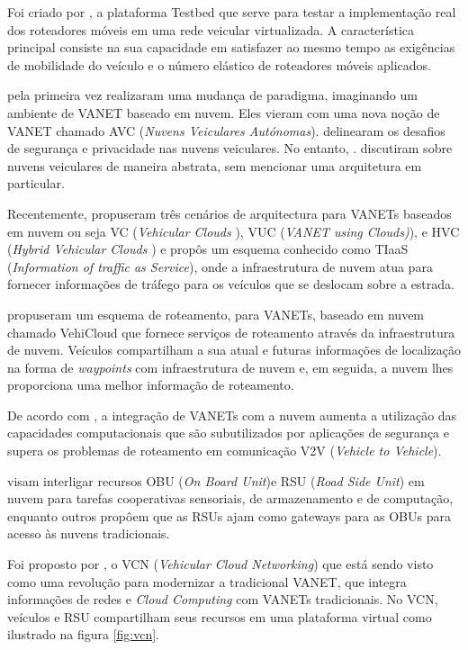 \documentclass[
	12pt,				%
	oneside,			%
	a4paper,			%
	english,			%
	brazil				%
	]{abntex2ppgsi}
\begin{document}
Foi criado por , a plataforma Testbed que serve para testar a implementação real dos roteadores móveis em uma rede veicular virtualizada. A característica principal consiste na sua capacidade em satisfazer ao mesmo tempo as exigências de mobilidade do veículo e o número elástico de roteadores móveis aplicados.

 pela primeira vez realizaram uma mudança de paradigma, imaginando um ambiente de VANET baseado em nuvem. Eles vieram com uma nova noção de VANET chamado AVC (\textit{Nuvens Veiculares Autónomas}).   delinearam os desafios de segurança e privacidade nas nuvens veiculares. No entanto, . discutiram sobre nuvens veiculares de maneira abstrata, sem mencionar uma arquitetura em  particular. 

Recentemente,  propuseram três cenários de arquitectura para VANETs baseados em nuvem ou seja VC (\textit{Vehicular Clouds }), VUC (\textit{VANET using Clouds)}), e HVC (\textit{Hybrid Vehicular Clouds }) e propôs um esquema conhecido como TIaaS (\textit{Information of traffic as Service}), onde a infraestrutura de nuvem atua para fornecer informações de tráfego para os veículos que se deslocam sobre a estrada.

  propuseram um esquema de roteamento, para VANETs, baseado em nuvem chamado VehiCloud que fornece serviços de roteamento através da infraestrutura de nuvem. Veículos compartilham a sua atual e futuras informações de localização na forma de \textit{waypoints} com infraestrutura de nuvem e, em seguida, a nuvem lhes proporciona uma melhor informação de roteamento.

De acordo com , a integração de VANETs com a nuvem aumenta a utilização das capacidades computacionais que são subutilizados por aplicações de segurança e supera os problemas de roteamento em comunicação V2V (\textit{Vehicle to Vehicle}).

 visam interligar recursos OBU (\textit{On Board Unit})e RSU (\textit{Road Side Unit}) em nuvem para tarefas cooperativas sensoriais, de armazenamento e de computação, enquanto outros \cite{hussain2012rethinking} \cite{mershad2013finding} propôem que as RSUs ajam como gateways para as OBUs para acesso às nuvens tradicionais.

Foi proposto por , o VCN (\textit{Vehicular Cloud Networking}) que está sendo visto como uma revolução para modernizar a tradicional VANET, que integra informações de redes e \textit{Cloud Computing} com VANETs tradicionais. No VCN, veículos e  RSU compartilham seus recursos em uma plataforma virtual como ilustrado na figura \ref{fig:vcn}.
\end{document}
